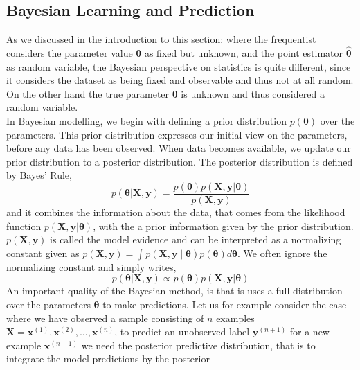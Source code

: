 \subsection{Bayesian Learning and Prediction}
As we discussed in the introduction to this section: where the frequentist considers the parameter value $\boldsymbol{\theta}$ as fixed but unknown, and the point estimator $\hat{\boldsymbol{\theta}}$ as random variable, the Bayesian perspective on statistics is quite different, since it considers the dataset as being fixed and observable and thus not at all random. On the other hand the true parameter $\boldsymbol{\theta}$ is unknown and thus considered a random variable. \\
In Bayesian modelling, we begin with defining a prior distribution $p(\boldsymbol{\theta})$ over the parameters. This prior distribution expresses our initial view on the parameters, before any data has been observed. When data becomes available, we update our prior distribution to a posterior distribution. The posterior distribution is defined by Bayes' Rule, 
\begin{equation*}
         p(\boldsymbol{\theta}|\mathbf{X},\mathbf{y})=\frac{p(\boldsymbol{\theta})p(\mathbf{X},\mathbf{y}|\boldsymbol{\theta})}{p(\mathbf{X},\mathbf{y})}
\end{equation*}
and it combines the information about the data, that comes from the likelihood function $p(\mathbf{X},\mathbf{y}|\boldsymbol{\theta})$, with the a prior information given by the prior distribution. $p(\mathbf{X},\mathbf{y})$ is called the model evidence and can be interpreted as a normalizing constant given as $p(\mathbf{X},\mathbf{y})=\int p(\mathbf{X},\mathbf{y}\mid \boldsymbol{\theta})p(\boldsymbol{\theta})d\boldsymbol{\theta}$.
We often ignore the normalizing constant and simply writes, 
\begin{equation} \label{eq:posterior}
    p(\boldsymbol{\theta}|\mathbf{X},\mathbf{y})\propto p(\boldsymbol{\theta})p(\mathbf{X},\mathbf{y}|\boldsymbol{\theta})
\end{equation}
An important quality of the Bayesian method, is that is uses a full distribution over the parameters $\boldsymbol{\theta}$ to make predictions. Let us for example consider the case where we have observed a sample consisting of $n$ examples $\mathbf{X}=\boldsymbol{x}^{(1)}, \boldsymbol{x}^{(2)},\ldots, \boldsymbol{x}^{(n)}$, to predict an unobserved label $\boldsymbol{y}^{(n+1)}$ for a new example $\boldsymbol{x}^{(n+1)}$ we need the 
posterior predictive distribution, that is to integrate the model predictions by the posterior
